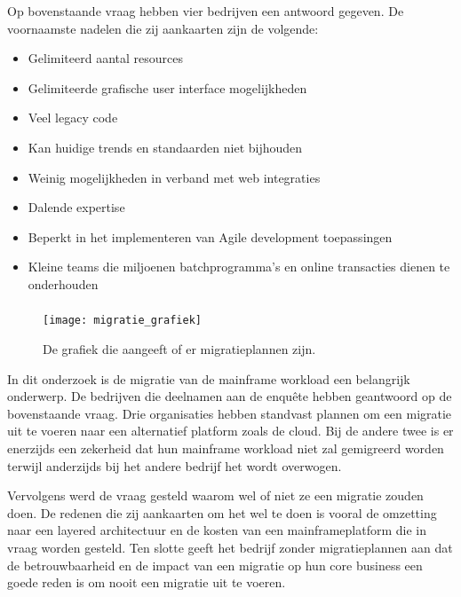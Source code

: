 Op bovenstaande vraag hebben vier bedrijven een antwoord gegeven. De voornaamste nadelen die zij aankaarten zijn de volgende:
  \begin{itemize}
     \item Gelimiteerd aantal resources 
     \item Gelimiteerde grafische user interface mogelijkheden
     \item Veel legacy code 
     \item Kan huidige trends en standaarden niet bijhouden
     \item Weinig mogelijkheden in verband met web integraties
     \item Dalende expertise
     \item Beperkt in het implementeren van Agile development toepassingen
     \item Kleine teams die miljoenen batchprogramma's en online transacties dienen te onderhouden
 \end{itemize}

\subsubsection{}
\label{sec:Heeft de organisatie migratieplannen?}

 \begin{figure}[h]
    \centering
    \texttt{[image: migratie\_grafiek]}
    \caption{De grafiek die aangeeft of er migratieplannen zijn.}
    \label{fig: migratieplannen}
\end{figure}


In dit onderzoek is de migratie van de mainframe workload een belangrijk onderwerp. De bedrijven die deelnamen aan de enquête hebben geantwoord op de bovenstaande vraag. Drie organisaties hebben standvast plannen om een migratie uit te voeren naar een alternatief platform zoals de cloud. Bij de andere twee is er enerzijds een zekerheid dat hun mainframe workload niet zal gemigreerd worden terwijl anderzijds bij het andere bedrijf het wordt overwogen. 

Vervolgens werd de vraag gesteld waarom wel of niet ze een migratie zouden doen. De redenen die zij aankaarten om het wel te doen is vooral de omzetting naar een layered architectuur en de kosten van een mainframeplatform die in vraag worden gesteld. Ten slotte geeft het bedrijf zonder migratieplannen aan dat de betrouwbaarheid en de impact van een migratie op hun core business een goede reden is om nooit een migratie uit te voeren. 

